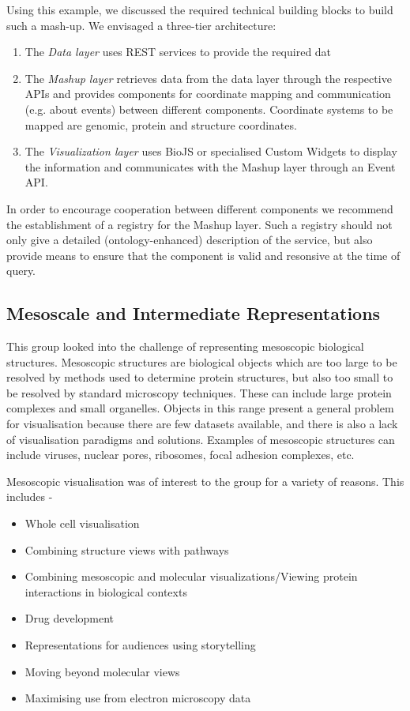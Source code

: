 \documentclass[a4paper]{article}
\begin{document}
Using this example, we discussed the required technical building blocks to build such a mash-up. We envisaged a three-tier architecture: 
\begin{enumerate}
\item The \emph{Data layer} uses REST services to provide the required dat 
\item The \emph{Mashup layer} retrieves data from the data layer through the respective APIs and provides components for coordinate mapping and communication (e.g. about events) between different components. Coordinate systems to be mapped are genomic, protein and structure coordinates.
\item The \emph{Visualization layer} uses BioJS or specialised Custom Widgets to display the information and communicates with the Mashup layer through an Event API.
\end{enumerate}

In order to encourage cooperation between different components we recommend the establishment of a registry for the Mashup layer. Such a registry should not only give a detailed (ontology-enhanced) description of the service, but also provide means to ensure that the component is valid and resonsive at the time of query.


\subsection{Mesoscale and Intermediate Representations}

This group looked into the challenge of representing mesoscopic biological structures. Mesoscopic structures are biological objects which are too large to be resolved by methods used to determine protein structures, but also too small to be resolved by standard microscopy techniques. These can include large protein complexes and small organelles. Objects in this range present a general problem for visualisation because there are few datasets available, and there is also a lack of visualisation paradigms and solutions. Examples of mesoscopic structures can include viruses, nuclear pores, ribosomes, focal adhesion complexes, etc.

Mesoscopic visualisation was of interest to the group for a variety of reasons.
This includes -
\begin{itemize}
\item Whole cell visualisation
\item Combining structure views with pathways
\item Combining mesoscopic and molecular visualizations/Viewing protein interactions in biological contexts
\item Drug development
\item Representations for audiences using storytelling
\item Moving beyond molecular views
\item Maximising use from electron microscopy data
\end{itemize}
\end{document}
